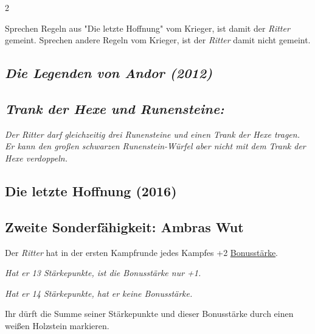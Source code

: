 \documentclass[10pt, a4paper, oneside]{book}
\newcommand{\fan}[1]{\textit{#1}}
\begin{document}
\begin{multicols*}{2}
\begin{nobgcolor}
Sprechen Regeln aus "Die letzte Hoffnung" vom Krieger, ist damit der \fan{Ritter} gemeint. Sprechen andere Regeln vom Krieger, ist der \fan{Ritter} damit nicht gemeint.







\end{nobgcolor}



\begin{bgcolor}
\section{\fan{Die Legenden von Andor (2012)}}

\subsection{\fan{Trank der Hexe und Runensteine:}}

\fan{Der Ritter darf gleichzeitig drei Runensteine und einen Trank der Hexe tragen. Er kann den großen schwarzen Runenstein-Würfel aber nicht mit dem Trank der Hexe verdoppeln.}

\end{bgcolor}



\begin{bgcolor}
\section{Die letzte Hoffnung (2016)}


\subsection{Zweite Sonderfähigkeit: Ambras Wut}

Der \fan{Ritter} hat in der ersten Kampfrunde jedes Kampfes +2 \hyperref[Bonusstärke]{Bonusstärke}.

\fan{Hat er 13 Stärkepunkte, ist die Bonusstärke nur +1.}

\fan{Hat er 14 Stärkepunkte, hat er keine Bonusstärke.}
\supercite{39829}

Ihr dürft die Summe seiner Stärkepunkte und dieser Bonusstärke durch einen weißen Holzstein markieren.\supercite{DlH:Begleitheft,DlH11:Heldenkarte_Krieger}

\end{bgcolor}


\end{multicols*}
\end{document}

